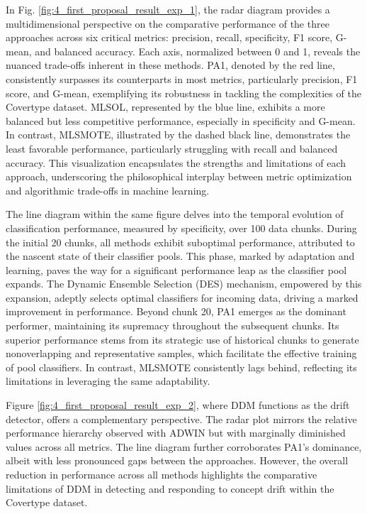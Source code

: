 In Fig. \ref{fig:4_first_proposal_result_exp_1}, the radar diagram provides a multidimensional perspective on the comparative performance of the three approaches across six critical metrics: precision, recall, specificity, F1 score, G-mean, and balanced accuracy. Each axis, normalized between 0 and 1, reveals the nuanced trade-offs inherent in these methods. PA1, denoted by the red line, consistently surpasses its counterparts in most metrics, particularly precision, F1 score, and G-mean, exemplifying its robustness in tackling the complexities of the Covertype dataset. MLSOL, represented by the blue line, exhibits a more balanced but less competitive performance, especially in specificity and G-mean. In contrast, MLSMOTE, illustrated by the dashed black line, demonstrates the least favorable performance, particularly struggling with recall and balanced accuracy. This visualization encapsulates the strengths and limitations of each approach, underscoring the philosophical interplay between metric optimization and algorithmic trade-offs in machine learning.

The line diagram within the same figure delves into the temporal evolution of classification performance, measured by specificity, over 100 data chunks. During the initial 20 chunks, all methods exhibit suboptimal performance, attributed to the nascent state of their classifier pools. This phase, marked by adaptation and learning, paves the way for a significant performance leap as the classifier pool expands. The Dynamic Ensemble Selection (DES) mechanism, empowered by this expansion, adeptly selects optimal classifiers for incoming data, driving a marked improvement in performance. Beyond chunk 20, PA1 emerges as the dominant performer, maintaining its supremacy throughout the subsequent chunks. Its superior performance stems from its strategic use of historical chunks to generate nonoverlapping and representative samples, which facilitate the effective training of pool classifiers. In contrast, MLSMOTE consistently lags behind, reflecting its limitations in leveraging the same adaptability.

Figure \ref{fig:4_first_proposal_result_exp_2}, where DDM functions as the drift detector, offers a complementary perspective. The radar plot mirrors the relative performance hierarchy observed with ADWIN but with marginally diminished values across all metrics. The line diagram further corroborates PA1’s dominance, albeit with less pronounced gaps between the approaches. However, the overall reduction in performance across all methods highlights the comparative limitations of DDM in detecting and responding to concept drift within the Covertype dataset.

